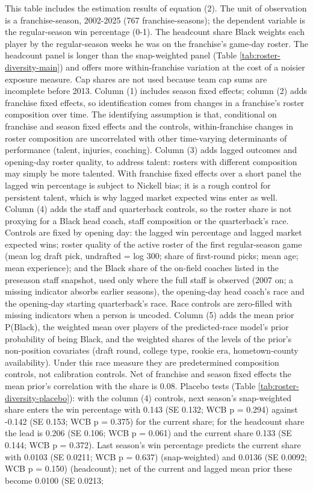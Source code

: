 \begin{table}[!h]
{\begin{threeparttable}
\begin{tablenotes}[para]
\item This table includes the estimation results of equation (2). The unit of observation is a franchise-season, 2002-2025 (767 franchise-seasons); the dependent variable is the regular-season win percentage (0-1). The headcount share Black weights each player by the regular-season weeks he was on the franchise's game-day roster. The headcount panel is longer than the snap-weighted panel (Table \ref{tab:roster-diversity-main}) and offers more within-franchise variation at the cost of a noisier exposure measure. Cap shares are not used because team cap sums are incomplete before 2013. Column (1) includes season fixed effects; column (2) adds franchise fixed effects, so identification comes from changes in a franchise's roster composition over time. The identifying assumption is that, conditional on franchise and season fixed effects and the controls, within-franchise changes in roster composition are uncorrelated with other time-varying determinants of performance (talent, injuries, coaching). Column (3) adds lagged outcomes and opening-day roster quality, to address talent: rosters with different composition may simply be more talented. With franchise fixed effects over a short panel the lagged win percentage is subject to Nickell bias; it is a rough control for persistent talent, which is why lagged market expected wins enter as well. Column (4) adds the staff and quarterback controls, so the roster share is not proxying for a Black head coach, staff composition or the quarterback's race. Controls are fixed by opening day: the lagged win percentage and lagged market expected wins; roster quality of the active roster of the first regular-season game (mean log draft pick, undrafted = log 300; share of first-round picks; mean age; mean experience); and the Black share of the on-field coaches listed in the preseason staff snapshot, used only where the full staff is observed (2007 on; a missing indicator absorbs earlier seasons), the opening-day head coach's race and the opening-day starting quarterback's race. Race controls are zero-filled with missing indicators when a person is uncoded. Column (5) adds the mean prior P(Black), the weighted mean over players of the predicted-race model's prior probability of being Black, and the weighted shares of the levels of the prior's non-position covariates (draft round, college type, rookie era, hometown-county availability). Under this race measure they are predetermined composition controls, not calibration controls. Net of franchise and season fixed effects the mean prior's correlation with the  share is 0.08. Placebo tests (Table \ref{tab:roster-diversity-placebo}): with the column (4) controls, next season's snap-weighted share enters the win percentage with 0.143 (SE 0.132; WCB p = 0.294) against -0.142 (SE 0.153; WCB p = 0.375) for the current share; for the headcount share the lead is 0.206 (SE 0.106; WCB p = 0.061) and the current share 0.133 (SE 0.144; WCB p = 0.372). Last season's win percentage predicts the current share with 0.0103 (SE 0.0211; WCB p = 0.637) (snap-weighted) and 0.0136 (SE 0.0092; WCB p = 0.150) (headcount); net of the current and lagged mean prior these become 0.0100 (SE 0.0213; 
\end{tablenotes}
\end{threeparttable}}
\end{table}
